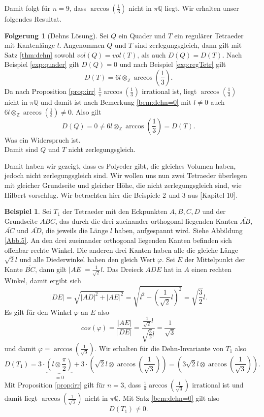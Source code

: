 \documentclass[11pt,titlepage]{article}
\newcommand{\setZ}{\mathbb{Z}}
\newcommand{\setQ}{\mathbb{Q}}
\newcommand{\abs}[1]{{\left| #1 \right|}}
\theoremstyle{definition}
\newtheorem{corollary}[theorem]{Folgerung}
\newtheorem{example}[theorem]{Beispiel}
\theoremstyle{remark}
\begin{document}
	Damit folgt für $n=9$, dass $\arccos\left(\frac{1}{3}\right)$ nicht in $\pi\setQ$ liegt. Wir erhalten unser 
	folgendes Resultat.
	
	\begin{corollary}[Dehns Lösung]
		Sei $Q$ ein Quader und $T$ ein regulärer Tetraeder mit Kantenlänge $l$. Angenommen 
		$Q$ und $T$ sind zerlegungsgleich, dann gilt mit Satz \ref{thm:dehn} sowohl $vol(Q)=vol(T)$, als auch 
		$D(Q)=D(T)$. 
		Nach Beispiel \ref{exp:quader} gilt $D(Q)=0$ und nach Beispiel \ref{exp:regTetr} gilt
		\[D(T)=6l\otimes_{\setZ}\arccos\left(\frac{1}{3}\right).\]
		Da nach Proposition \ref{prop:irr} $\frac{1}{\pi}\arccos\left(\frac{1}{3}\right)$ irrational ist, liegt
		$\arccos\left(\frac{1}{3}\right)$ nicht in $\pi\setQ$ und damit ist nach Bemerkung \ref{bem:dehn=0} 
		mit $l\neq 0$ auch $6l\otimes_{\setZ}\arccos\left(\frac{1}{3}\right)\neq 0$. Also gilt
		\[ D(Q)=0\neq 6l\otimes_{\setZ}\arccos\left(\frac{1}{3}\right)=D(T).\]
		Was ein Widerspruch ist. \\
		Damit sind $Q$ und $T$ nicht zerlegungsgleich.
	\end{corollary}	
	
	Damit haben wir gezeigt, dass es Polyeder gibt, die gleiches Volumen haben, 
	jedoch nicht zerlegungsgleich sind. Wir wollen uns nun zwei Tetraeder 
	überlegen mit gleicher Grundseite und gleicher Höhe, die nicht 
	zerlegungsgleich sind, wie Hilbert vorschlug. Wir betrachten hier 
	die Beispiele 2 und 3 aus \cite{Proofsfromthebook}[Kapitel 10].
	
	\begin{example}
		Sei $T_1$ der Tetraeder mit den Eckpunkten $A,B,C,D$ und der Grundseite 
		$ABC$, das durch die drei zueinander orthogonal liegenden Kanten 
		$\overline{AB}$, $\overline{AC}$ und $\overline{AD}$, die jeweils 
		die Länge $l$ haben, aufgespannt wird. Siehe 
		Abbildung \ref{Abb.5}. 
		An den drei zueinander orthogonal liegenden Kanten befinden sich 
		offenbar rechte Winkel. Die anderen drei Kanten haben alle 
		die gleiche Länge $\sqrt{2}l$ und alle Diederwinkel 
		haben den gleich Wert $\varphi$. Sei $E$ der Mittelpunkt der Kante 
		$\overline{BC}$, dann gilt $\abs{AE}=\frac{1}{\sqrt{2}}l$. Das 
		Dreieck $ADE$ hat in $A$ einen rechten Winkel, damit ergibt sich
		\[\abs{DE}=\sqrt{\abs{AD}^2 +\abs{AE}^2}=\sqrt{l^2 +\left(\frac{1}{\sqrt{2}}l\right)^2}=\sqrt{\frac{3}{2}}l.\]
		Es gilt für den Winkel $\varphi$ an $E$ also
		\[cos(\varphi)=\frac{\abs{AE}}{\abs{DE}}=\frac{\frac{1}{\sqrt{2}}l}{\sqrt{\frac{3}{2}}l}=\frac{1}{\sqrt{3}}\]
		und damit $\varphi=\arccos\left(\frac{1}{\sqrt{3}}\right)$. 
		Wir erhalten für die Dehn-Invariante von $T_1$ also
		\[D(T_1)=3\cdot\underbrace{\left(l\otimes\frac{\pi}{2}\right)}_{=0}+3\cdot\left(\sqrt{2}l\otimes\arccos\left(\frac{1}{\sqrt{3}}\right)\right)=\left(3\sqrt{2}l\otimes\arccos\left(\frac{1}{\sqrt{3}}\right)\right).\]
		Mit Proposition \ref{prop:irr} gilt für $n=3$, dass 
		$\frac{1}{\pi}\arccos\left(\frac{1}{\sqrt{3}}\right)$ irrational ist 
		und damit liegt $\arccos\left(\frac{1}{\sqrt{3}}\right)$ nicht 
		in $\pi\setQ$. Mit Satz \ref{bem:dehn=0} gilt also 
		\[D(T_1)\neq 0.\]
	\end{example}
	
\end{document}
